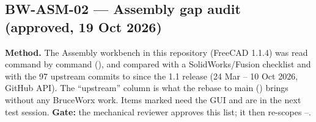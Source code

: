 \subsection{BW-ASM-02 --- Assembly gap audit (approved, 19 Oct 2026)}\label{sec:asm-audit}

\textbf{Method.} The Assembly workbench in this repository (FreeCAD 1.1.4) was read command by command
(), and compared with a SolidWorks/Fusion checklist and with the 97 upstream commits
to  since the 1.1 release (24 Mar -- 10 Oct 2026, GitHub API). The ``upstream'' column
is what the rebase to main () brings without any BruceWorx work. Items marked \verify{} need the
GUI and are in the next test session. \textbf{Gate:} the mechanical reviewer approves this list; it then
re-scopes --.


